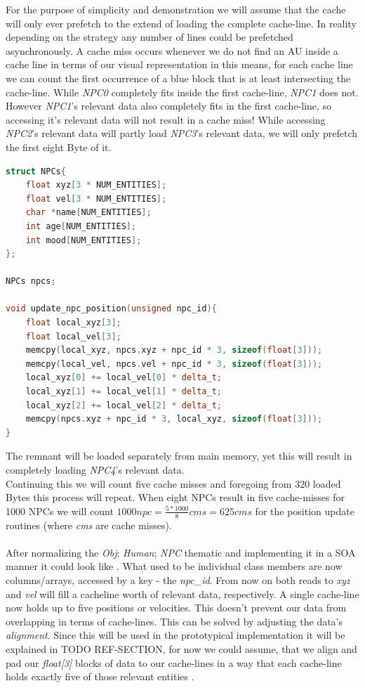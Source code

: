 For the purpose of simplicity and demonstration we will assume that the cache will only ever prefetch to the extend of loading the complete cache-line. In reality depending on the strategy any number of lines could be prefetched asynchronously. A cache miss occurs whenever we do not find an AU inside a cache line in terms of our visual representation in  this means, for each cache line we can count the first occurrence of a blue block that is at least intersecting the cache-line. While \textit{NPC0} completely fits inside the first cache-line, \textit{NPC1} does not. However \textit{NPC1}'s relevant data also completely fits in the first cache-line, so accessing it's relevant data will not result in a cache miss! While accessing \textit{NPC2}'s relevant data will partly load \textit{NPC3}'s relevant data, we will only prefetch the first eight Byte of it.
\begin{lstlisting}[language=C++,name={SOA variant of the NPC},label={soa_npc}]
struct NPCs{
	float xyz[3 * NUM_ENTITIES];
	float vel[3 * NUM_ENTITIES];
	char *name[NUM_ENTITIES];
	int age[NUM_ENTITIES];
	int mood[NUM_ENTITIES];
};

NPCs npcs;

void update_npc_position(unsigned npc_id){
	float local_xyz[3];
	float local_vel[3];
	memcpy(local_xyz, npcs.xyz + npc_id * 3, sizeof(float[3]));
	memcpy(local_vel, npcs.vel + npc_id * 3, sizeof(float[3]));
	local_xyz[0] += local_vel[0] * delta_t;
	local_xyz[1] += local_vel[1] * delta_t;
	local_xyz[2] += local_vel[2] * delta_t;
	memcpy(npcs.xyz + npc_id * 3, local_xyz, sizeof(float[3]));
}
\end{lstlisting}
The remnant will be loaded separately from main memory, yet this will result in completely loading \textit{NPC4}'s relevant data.\\
Continuing this we will count five cache misses and foregoing from 320 loaded Bytes this process will repeat. When eight NPCs result in five cache-misses for 1000 NPCs we will count $1000 npc = \frac{5 * 1000}{8} cms = 625 cms
$ for the position update routines (where \textit{cms} are cache misses).\\\\
After normalizing the \textit{Obj}; \textit{Human}; \textit{NPC} thematic and implementing it in a SOA manner it could look like . What used to be individual class members are now columns/arrays, accessed by a key - the \textit{npc\_id}. From now on both reads to \textit{xyz} and \textit{vel} will fill a cacheline worth of relevant data, respectively. A single cache-line now holds up to five positions or velocities. This doesn't prevent our data from overlapping in terms of cache-lines. This can be solved by adjusting the data's \textit{alignment}. Since this will be used in the prototypical implementation it will be explained in TODO REF-SECTION, for now we could assume, that we align and pad our \textit{float[3]} blocks of data to our cache-lines in a way that each cache-line holds exactly five of those relevant entities .
